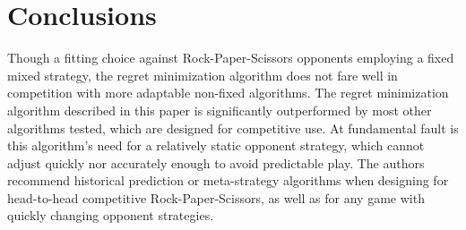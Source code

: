 
\section{Conclusions}
\label{sec:concl}

Though a fitting choice against Rock-Paper-Scissors opponents employing a fixed mixed strategy, the regret minimization algorithm does not fare well in competition with more adaptable non-fixed algorithms.  The regret minimization algorithm described in this paper is significantly outperformed by most other algorithms tested, which are designed for competitive use.  At fundamental fault is this algorithm's need for a relatively static opponent strategy, which cannot adjust quickly nor accurately enough to avoid predictable play.  The authors recommend historical prediction or meta-strategy algorithms when designing for head-to-head competitive Rock-Paper-Scissors, as well as for any game with quickly changing opponent strategies.

